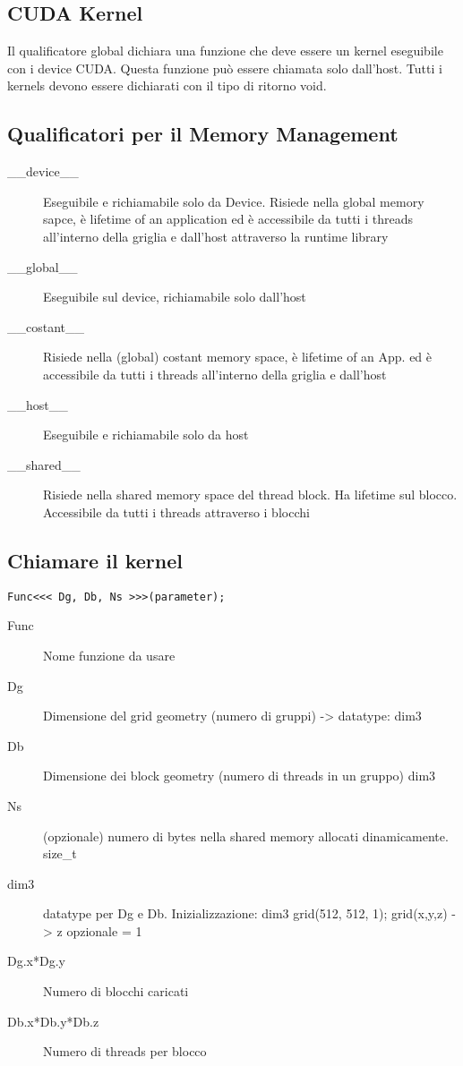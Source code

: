 \documentclass[8pt,a4paper]{article}
\newcommand{\m}[1]{\texttt{#1}}
\begin{document}
\begin{multicols}{5}
    \subsection{CUDA Kernel}
    Il qualificatore global dichiara una funzione che deve essere un kernel eseguibile con i device CUDA.
    Questa funzione può essere chiamata solo dall’host. Tutti i kernels devono essere dichiarati con il 
    tipo di ritorno void. 
    
    \subsection{Qualificatori per il Memory Management}
    \begin{description}
        \item [\_\_device\_\_] Eseguibile e richiamabile solo da Device. Risiede nella global memory sapce,
        è  lifetime of an application ed è accessibile da tutti i threads all’interno della griglia e dall’host
        attraverso la runtime library
        \item [\_\_global\_\_] Eseguibile sul device, richiamabile solo dall’host
        \item [\_\_costant\_\_] Risiede nella (global) costant memory space, è lifetime of an App. ed è 
        accessibile da tutti i threads all’interno della griglia e dall’host
        \item [\_\_host\_\_] Eseguibile e richiamabile solo da host
        \item [\_\_shared\_\_] Risiede nella shared memory space del thread block. Ha lifetime sul blocco. 
        Accessibile da tutti i threads attraverso i blocchi
    \end{description}
    
    \subsection{Chiamare il kernel}
    \m{Func<<< Dg, Db, Ns >>>(parameter);}
    
    \begin{description}
        \item [Func] Nome funzione da usare
        \item [Dg] Dimensione del grid geometry (numero di gruppi) -> {\color{red} datatype: dim3}
        \item [Db] Dimensione dei block geometry (numero di threads in un gruppo) {\color{red} dim3}
        \item [Ns] (opzionale) numero di bytes nella shared memory allocati dinamicamente. {\color{red} size\_t}
        \item [dim3] datatype per Dg e Db. Inizializzazione: dim3 grid(512, 512, 1); grid(x,y,z) -> z opzionale = 1
        \item [Dg.x*Dg.y] Numero di blocchi caricati
        \item [Db.x*Db.y*Db.z] Numero di threads per blocco
    \end{description}
    

\end{multicols}
\end{document}
